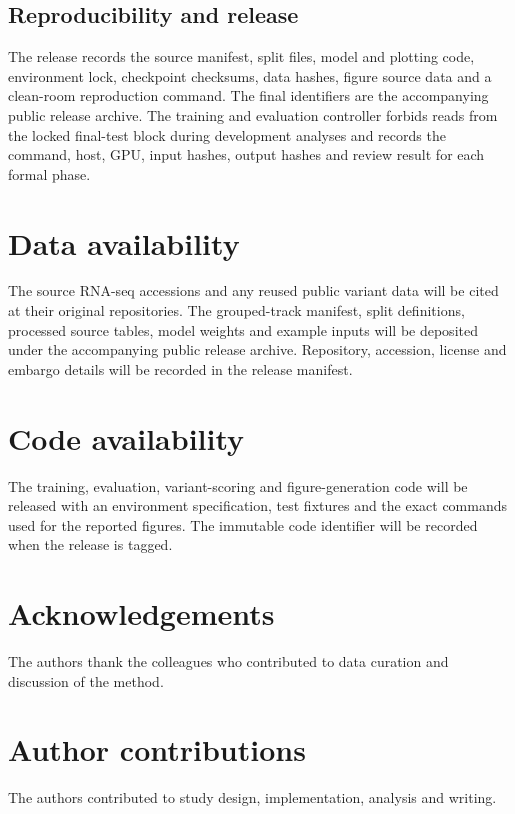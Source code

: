 \documentclass[pdflatex,sn-nature]{sn-jnl}
\newcommand{\ExtRelease}{the accompanying public release archive}
\begin{document}
\subsection{Reproducibility and release}

The release records the source manifest, split files, model and plotting code,
environment lock, checkpoint checksums, data hashes, figure source data and a
clean-room reproduction command. The final identifiers are \ExtRelease. The
training and evaluation controller forbids reads from the locked final-test
block during development analyses and records the command, host, GPU, input
hashes, output hashes and review result for each formal phase.

\section*{Data availability}

The source RNA-seq accessions and any reused public variant data will be cited
at their original repositories. The grouped-track manifest, split definitions,
processed source tables, model weights and example inputs will be deposited
under \ExtRelease. Repository, accession, license and embargo details will be
recorded in the release manifest.

\section*{Code availability}

The training, evaluation, variant-scoring and figure-generation code will be
released with an environment specification, test fixtures and the exact
commands used for the reported figures. The immutable code identifier will be
recorded when the release is tagged.

\section*{Acknowledgements}

The authors thank the colleagues who contributed to data curation and
discussion of the method.

\section*{Author contributions}

The authors contributed to study design, implementation, analysis and writing.
\end{document}
